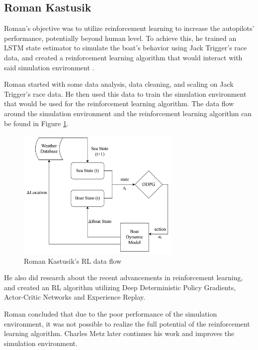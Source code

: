 \documentclass[12pt,twoside]{report}
\begin{document}
\subsection{Roman Kastusik}
Roman's objective was to utilize reinforcement learning to increase the autopilots' performance, potentially beyond human level. To achieve this, he trained an LSTM state estimator to simulate the boat's behavior using Jack Trigger's race data, and created a reinforcement learning algorithm that would interact with said simulation environment \cite{roman}.

Roman started with some data analysis, data cleaning, and scaling on Jack Trigger's race data. He then used this data to train the simulation environment that would be used for the reinforcement learning algorithm. The data flow around the simulation environment and the reinforcement learning algorithm can be found in Figure \ref{fig:roman dataflow}.

\begin{figure}[h]
\centering
\includegraphics[width = 0.7\textwidth]{figures/roman data flow.png}
\caption{Roman Kastusik's RL data flow \cite{roman}}
\label{fig:roman dataflow}
\end{figure}

He also did research about the recent advancements in reinforcement learning, and created an RL algorithm utilizing Deep Deterministic Policy Gradients, Actor-Critic Networks and Experience Replay.

Roman concluded that due to the poor performance of the simulation environment, it was not possible to realize the full potential of the reinforcement learning algorithm. Charles Metz later continues his work and improves the simulation environment.
\end{document}
